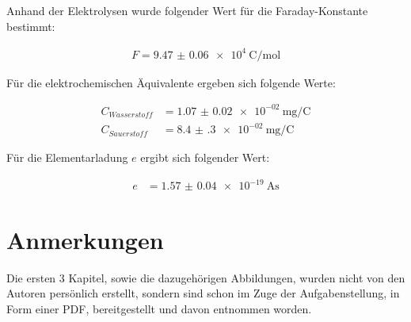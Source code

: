 \documentclass[11pt,ngerman]{scrartcl}
\begin{document}
Anhand der Elektrolysen wurde folgender Wert für die Faraday-Konstante bestimmt:

\begin{align*}
	F = \SI{9.47(6)e4}{\coulomb\per\mol}
\end{align*}

Für die elektrochemischen Äquivalente ergeben sich folgende Werte:

\begin{align*}
	C_{Wasserstoff} & = \SI{1.07(2)e-02}{\mg\per\coulomb} \\
	C_{Sauerstoff}  & = \SI{8.4(3)e-02}{\mg\per\coulomb}
\end{align*}

Für die Elementarladung $e$ ergibt sich folgender Wert:

\begin{align*}
	e & = \SI{1.57(4)e-19}{\ampere\second}
\end{align*}


\section{Anmerkungen}

Die ersten 3 Kapitel, sowie die dazugehörigen Abbildungen, wurden nicht von den
Autoren persönlich erstellt, sondern sind schon im Zuge der Aufgabenstellung,
in Form einer PDF, bereitgestellt und davon entnommen worden. \cite{vorlagesilber}


\newpage

\printbibliography
\listoffigures
\listoftables
\end{document}
